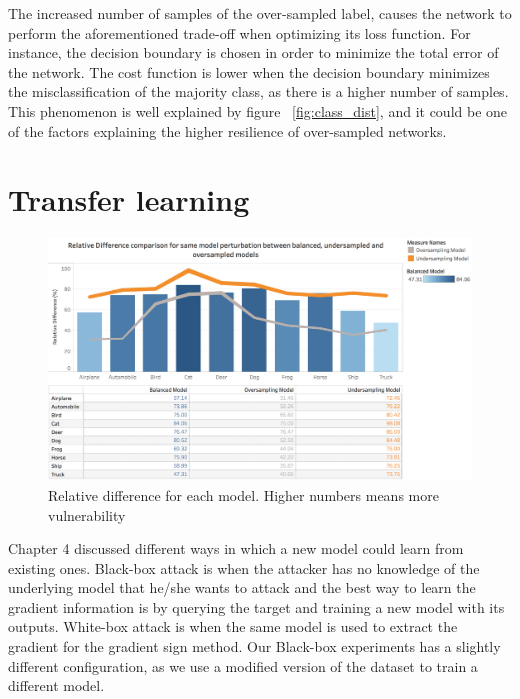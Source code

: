 The increased number of samples of the over-sampled label, causes the network to perform the aforementioned trade-off when optimizing its loss function. For instance, the decision boundary is chosen in order to minimize the total error of the network. The cost function is lower when the decision boundary minimizes the misclassification of the majority class, as there is a higher number of samples. This phenomenon is well explained by figure ~\ref{fig:class_dist}, and it could be one of the factors explaining the higher resilience of over-sampled networks.




\section{Transfer learning}
\begin{figure}
	\centering
	\includegraphics[scale=0.3]{rel_diff_graph.png}
	\caption{Relative difference for each model. Higher numbers means more vulnerability}
	\label{fig:relative_difference}
\end{figure}
Chapter 4 discussed different ways in which a new model could learn from existing ones. Black-box attack is when the attacker has no knowledge of the underlying model that he/she wants to attack and the best way to learn the gradient information is by querying the target and training a new model with its outputs. White-box attack is when the same model is used to extract the gradient for the gradient sign method. Our Black-box experiments has a slightly different configuration, as we use a modified version of the dataset to train a different model.


